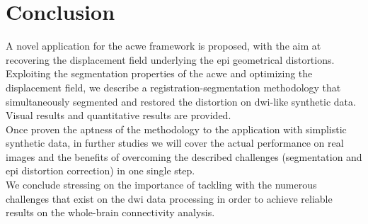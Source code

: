 \section{Conclusion}
\label{sec:conclusion}
%
A novel application for the \ac{acwe} framework is proposed,
with the aim at recovering the displacement field underlying 
the \ac{epi} geometrical distortions. Exploiting the segmentation
properties of the \ac{acwe} and optimizing the displacement
field, we describe a registration-segmentation methodology that
simultaneously segmented and restored the distortion on 
\ac{dwi}-like synthetic data. Visual results and quantitative
results are provided. \\

Once proven the aptness of the methodology to the application
with simplistic synthetic data, in further studies we will 
cover the actual performance on real images and the benefits 
of overcoming the described challenges (segmentation and 
\ac{epi} distortion correction) in one single step.\\

We conclude stressing on the importance of tackling with
the numerous challenges that exist on the \ac{dwi} data 
processing in order to achieve reliable results on the
whole-brain connectivity analysis.
